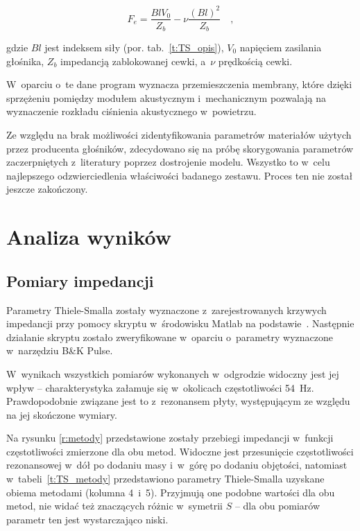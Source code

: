 \documentclass[12pt]{oska}
\begin{document}
	\begin{equation}
	F_e=\frac{BlV_0}{Z_b}-\nu\frac{(Bl)^2}{Z_b} \quad, \label{eq:sila}
	\end{equation}
	
	\noindent gdzie $Bl$ jest indeksem siły (por. tab.~\ref{t:TS_opis}), $V_0$ napięciem zasilania głośnika, $Z_b$ impedancją zablokowanej cewki, a~$\nu$ prędkością cewki. 
	
	W~oparciu o~te dane program wyznacza przemieszczenia membrany, które dzięki sprzężeniu pomiędzy modułem akustycznym i~mechanicznym pozwalają na wyznaczenie rozkładu ciśnienia akustycznego w~powietrzu.
	
	Ze względu na brak możliwości zidentyfikowania parametrów materiałów użytych przez producenta głośników, zdecydowano się na próbę skorygowania parametrów zaczerpniętych z~literatury \cite{modelowanie} poprzez dostrojenie modelu. Wszystko to w~celu najlepszego odzwierciedlenia właściwości badanego zestawu. Proces ten nie został jeszcze zakończony.
	
	
	\section{Analiza wyników}
	
	\subsection{Pomiary impedancji}
	
	Parametry Thiele-Smalla zostały wyznaczone z~zarejestrowanych krzywych impedancji przy pomocy skryptu w~środowisku Matlab na podstawie~\cite{dobrucki}. Następnie działanie skryptu zostało zweryfikowane w~oparciu o~parametry wyznaczone w~narzędziu B\&K Pulse. 
	
	W~wynikach wszystkich pomiarów wykonanych w~odgrodzie widoczny jest jej wpływ -- charakterystyka załamuje się w~okolicach częstotliwości \SI{54}{\hertz}. Prawdopodobnie związane jest to z~rezonansem płyty, występującym ze względu na jej skończone wymiary.
	
	Na rysunku \ref{r:metody} przedstawione zostały przebiegi impedancji w~funkcji częstotliwości zmierzone dla obu metod. Widoczne jest przesunięcie częstotliwości rezonansowej w~dół po dodaniu masy i~w~górę po dodaniu objętości, natomiast w~tabeli~\ref{t:TS_metody} przedstawiono parametry Thiele-Smalla uzyskane obiema metodami (kolumna 4~i~5). Przyjmują one podobne wartości dla obu metod, nie widać też znaczących różnic w~symetrii $S$ -- dla obu pomiarów parametr ten jest wystarczająco niski.
	
\end{document}

